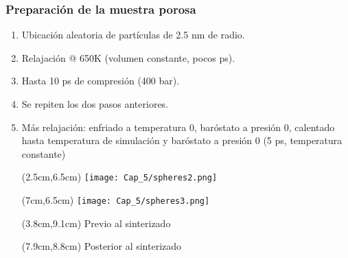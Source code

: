 \begin{frame}
    \frametitle{Preparaci\'on de la muestra porosa}
    \vspace{0cm}
    \begin{enumerate}
        \item Ubicaci\'on aleatoria de part\'iculas de 2.5 nm de radio.
        \item Relajaci\'on @ 650K (volumen constante, pocos ps). 
        \item Hasta 10 ps de compresi\'on (400 bar).
        \item Se repiten los dos pasos anteriores.
        \item M\'as relajaci\'on: enfriado a temperatura 0, bar\'ostato a presi\'on 0, calentado hasta temperatura de simulaci\'on y bar\'ostato a presi\'on 0 (5 ps, temperatura constante)
        \begin{textblock*}{3cm}(2.5cm,6.5cm) %
            \texttt{[image: Cap\_5/spheres2.png]}
        \end{textblock*}
        \begin{textblock*}{3cm}(7cm,6.5cm) %
            \texttt{[image: Cap\_5/spheres3.png]}
        \end{textblock*}
        \begin{textblock*}{3cm}(3.8cm,9.1cm)
         \scriptsize{Previo al sinterizado}
        \end{textblock*}
        \begin{textblock*}{3cm}(7.9cm,8.8cm)
         \scriptsize{Posterior al sinterizado}         
        \end{textblock*}
    \end{enumerate}
\end{frame}


